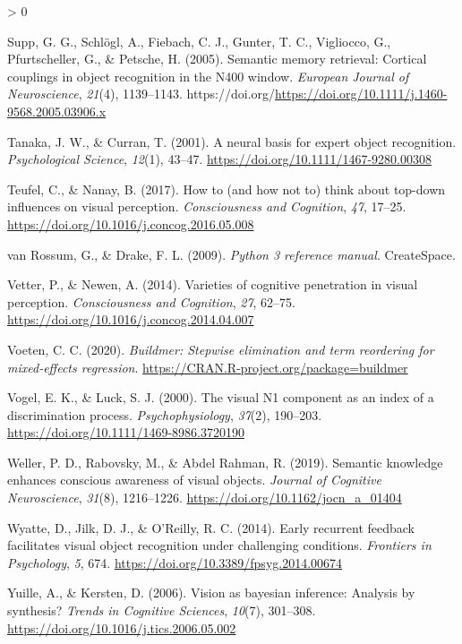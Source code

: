 \documentclass[
  english,
  man,floatsintext]{apa7}
\newlength{\cslhangindent}
\newenvironment{CSLReferences}[2] %
 {%
  \setlength{\parindent}{0pt}
  \ifodd #1 \everypar{\setlength{\hangindent}{\cslhangindent}}\ignorespaces\fi
  \ifnum #2 > 0
  \setlength{\parskip}{#2\baselineskip}
  \fi
 }%
 {}
\begin{document}
\begin{CSLReferences}{1}{0}
\leavevmode\hypertarget{ref-supp2005}{}%
Supp, G. G., Schlögl, A., Fiebach, C. J., Gunter, T. C., Vigliocco, G., Pfurtscheller, G., \& Petsche, H. (2005). Semantic memory retrieval: Cortical couplings in object recognition in the N400 window. \emph{European Journal of Neuroscience}, \emph{21}(4), 1139--1143. https://doi.org/\url{https://doi.org/10.1111/j.1460-9568.2005.03906.x}

\leavevmode\hypertarget{ref-tanaka2001}{}%
Tanaka, J. W., \& Curran, T. (2001). A neural basis for expert object recognition. \emph{Psychological Science}, \emph{12}(1), 43--47. \url{https://doi.org/10.1111/1467-9280.00308}

\leavevmode\hypertarget{ref-teufel2017}{}%
Teufel, C., \& Nanay, B. (2017). How to (and how not to) think about top-down influences on visual perception. \emph{Consciousness and Cognition}, \emph{47}, 17--25. \url{https://doi.org/10.1016/j.concog.2016.05.008}

\leavevmode\hypertarget{ref-vanrossum2009}{}%
van Rossum, G., \& Drake, F. L. (2009). \emph{Python 3 reference manual}. CreateSpace.

\leavevmode\hypertarget{ref-vetter2014}{}%
Vetter, P., \& Newen, A. (2014). Varieties of cognitive penetration in visual perception. \emph{Consciousness and Cognition}, \emph{27}, 62--75. \url{https://doi.org/10.1016/j.concog.2014.04.007}

\leavevmode\hypertarget{ref-R-buildmer}{}%
Voeten, C. C. (2020). \emph{Buildmer: Stepwise elimination and term reordering for mixed-effects regression}. \url{https://CRAN.R-project.org/package=buildmer}

\leavevmode\hypertarget{ref-vogel2000}{}%
Vogel, E. K., \& Luck, S. J. (2000). The visual {N1} component as an index of a discrimination process. \emph{Psychophysiology}, \emph{37}(2), 190--203. \url{https://doi.org/10.1111/1469-8986.3720190}

\leavevmode\hypertarget{ref-weller2019}{}%
Weller, P. D., Rabovsky, M., \& Abdel Rahman, R. (2019). Semantic knowledge enhances conscious awareness of visual objects. \emph{Journal of Cognitive Neuroscience}, \emph{31}(8), 1216--1226. \url{https://doi.org/10.1162/jocn_a_01404}

\leavevmode\hypertarget{ref-wyatte2014}{}%
Wyatte, D., Jilk, D. J., \& O'Reilly, R. C. (2014). Early recurrent feedback facilitates visual object recognition under challenging conditions. \emph{Frontiers in Psychology}, \emph{5}, 674. \url{https://doi.org/10.3389/fpsyg.2014.00674}

\leavevmode\hypertarget{ref-yuille2006}{}%
Yuille, A., \& Kersten, D. (2006). Vision as bayesian inference: Analysis by synthesis? \emph{Trends in Cognitive Sciences}, \emph{10}(7), 301--308. \url{https://doi.org/10.1016/j.tics.2006.05.002}

\end{CSLReferences}
\end{document}
